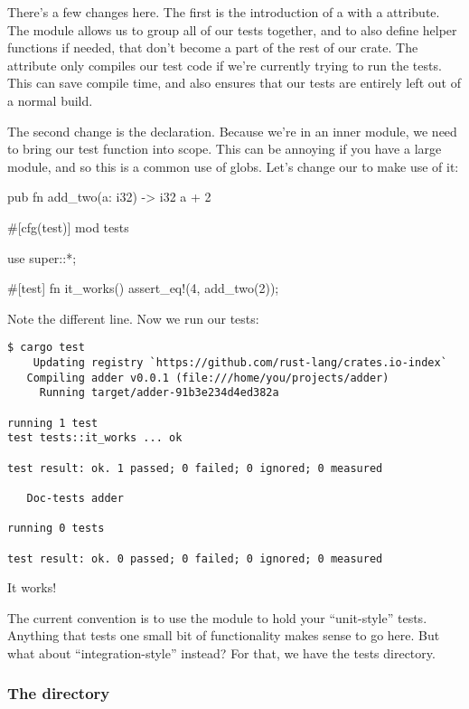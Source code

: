 There's a few changes here. The first is the introduction of a  with a  attribute. The module allows 
us to group all of our tests together, and to also define helper functions if needed, that don't become a part of the rest of 
our crate. The  attribute only compiles our test code if we're currently trying to run the tests. This can save compile 
time, and also ensures that our tests are entirely left out of a normal build.

\blank

The second change is the  declaration. Because we're in an inner module, we need to bring our test function into scope. 
This can be annoying if you have a large module, and so this is a common use of globs. Let's change our  to make 
use of it:

\begin{rustc}
pub fn add_two(a: i32) -> i32 {
    a + 2
}

#[cfg(test)]
mod tests {
    use super::*;

    #[test]
    fn it_works() {
        assert_eq!(4, add_two(2));
    }
}
\end{rustc}

Note the different  line. Now we run our tests:

\begin{verbatim}
$ cargo test
    Updating registry `https://github.com/rust-lang/crates.io-index`
   Compiling adder v0.0.1 (file:///home/you/projects/adder)
     Running target/adder-91b3e234d4ed382a

running 1 test
test tests::it_works ... ok

test result: ok. 1 passed; 0 failed; 0 ignored; 0 measured

   Doc-tests adder

running 0 tests

test result: ok. 0 passed; 0 failed; 0 ignored; 0 measured
\end{verbatim}

It works!

\blank

The current convention is to use the  module to hold your \enquote{unit-style} tests. Anything that tests one 
small bit of functionality makes sense to go here. But what about \enquote{integration-style}  instead? For that, 
we have the tests directory.

\subsubsection*{The  directory}


